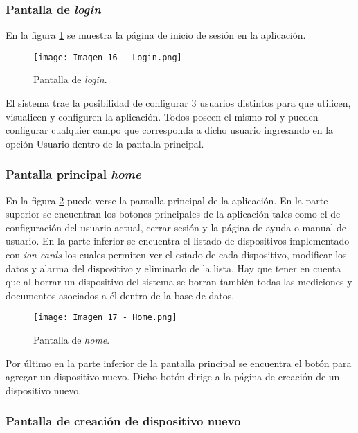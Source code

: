 \subsubsection{Pantalla de \textit{login}}

En la figura \ref{fig:16} se muestra la página de inicio de sesión en la aplicación.

\begin{figure}[h]
\centering
\texttt{[image: Imagen 16 - Login.png]}
\caption[Pantalla login]{Pantalla de \textit{login}. \footnotemark}
\label{fig:16}
\end{figure}

El sistema trae la posibilidad de configurar 3 usuarios distintos para que utilicen, visualicen y configuren la aplicación. Todos poseen el mismo rol y pueden configurar cualquier campo que corresponda a dicho usuario ingresando en la opción Usuario dentro de la pantalla principal.

\subsubsection{Pantalla principal \textit{home}}

En la figura \ref{fig:17} puede verse la pantalla principal de la aplicación. En la parte superior se encuentran los botones principales de la aplicación tales como el de configuración del usuario actual, cerrar sesión y la página de ayuda o manual de usuario. En la parte inferior se encuentra el listado de dispositivos implementado con \textit{ion-cards} los cuales permiten ver el estado de cada dispositivo, modificar los datos y alarma del dispositivo y eliminarlo de la lista. Hay que tener en cuenta que al borrar un dispositivo del sistema se borran también todas las mediciones y documentos asociados a él dentro de la base de datos.

\begin{figure}[h]
\centering
\texttt{[image: Imagen 17 - Home.png]}
\caption[Pantalla home]{Pantalla de \textit{home}. \footnotemark}
\label{fig:17}
\end{figure}

Por último en la parte inferior de la pantalla principal se encuentra el botón para agregar un dispositivo nuevo. Dicho botón dirige a la página de creación de un dispositivo nuevo.

\subsubsection{Pantalla de creación de dispositivo nuevo}

